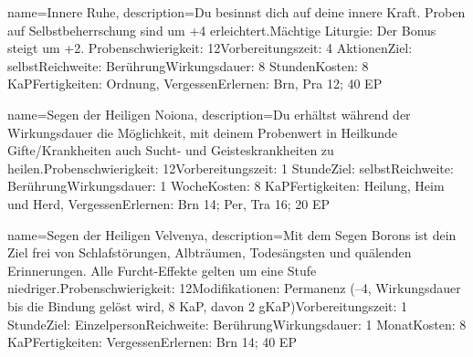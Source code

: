 {
    name={Innere Ruhe},
    description={Du besinnst dich auf deine innere Kraft. Proben auf Selbstbeherrschung sind um +4 erleichtert.\newline Mächtige Liturgie: Der Bonus steigt um +2. Probenschwierigkeit: 12\newline Vorbereitungszeit: 4 Aktionen\newline Ziel: selbst\newline Reichweite: Berührung\newline Wirkungsdauer: 8 Stunden\newline Kosten: 8 KaP\newline Fertigkeiten: Ordnung, Vergessen\newline Erlernen: Brn, Pra 12; 40 EP}
}


{
    name={Segen der Heiligen Noiona},
    description={Du erhältst während der Wirkungsdauer die Möglichkeit, mit deinem Probenwert in Heilkunde Gifte/Krankheiten auch Sucht- und Geisteskrankheiten zu heilen.\newline Probenschwierigkeit: 12\newline Vorbereitungszeit: 1 Stunde\newline Ziel: selbst\newline Reichweite: Berührung\newline Wirkungsdauer: 1 Woche\newline Kosten: 8 KaP\newline Fertigkeiten: Heilung, Heim und Herd, Vergessen\newline Erlernen: Brn 14; Per, Tra 16; 20 EP}
}


{
    name={Segen der Heiligen Velvenya},
    description={Mit dem Segen Borons ist dein Ziel frei von Schlafstörungen, Albträumen, Todesängsten und quälenden Erinnerungen. Alle Furcht-Effekte gelten um eine Stufe niedriger.\newline Probenschwierigkeit: 12\newline Modifikationen: Permanenz (–4, Wirkungsdauer bis die Bindung gelöst wird, 8 KaP, davon 2 gKaP)\newline Vorbereitungszeit: 1 Stunde\newline Ziel: Einzelperson\newline Reichweite: Berührung\newline Wirkungsdauer: 1 Monat\newline Kosten: 8 KaP\newline Fertigkeiten: Vergessen\newline Erlernen: Brn 14; 40 EP}
}


